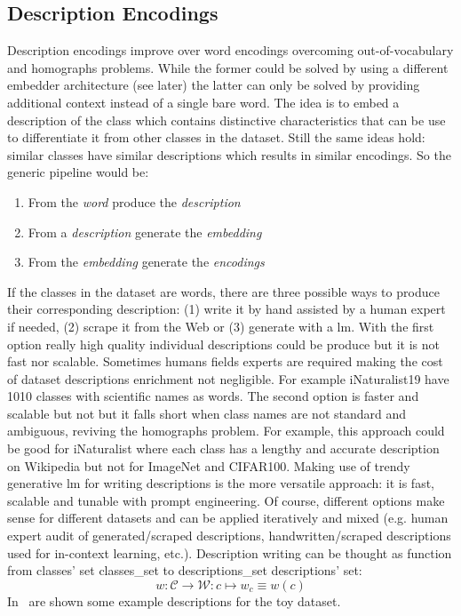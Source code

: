 \subsection{Description Encodings}
\label{subsec:description-encodings}

Description encodings improve over word encodings overcoming out-of-vocabulary and homographs problems. While the former could be solved by using a different embedder architecture (see later) the latter can only be solved by providing additional context instead of a single bare word. 
The idea is to embed a description of the class which contains distinctive characteristics that can be use to differentiate it from other classes in the dataset. Still the same ideas hold: similar classes have similar descriptions which results in similar encodings.
So the generic pipeline would be:
\begin{enumerate}
  \item From the \emph{word} produce the \emph{description}
  \item From a \emph{description} generate the \emph{embedding}
  \item From the \emph{embedding} generate the \emph{encodings}
\end{enumerate}

If the classes in the dataset are words, there are three possible ways to produce their corresponding description: (1) write it by hand assisted by a human expert if needed, (2) scrape it from the Web or (3) generate with a \acrshort{lm}.
With the first option really high quality individual descriptions could be produce but it is not fast nor scalable. Sometimes humans fields experts are required making the cost of dataset descriptions enrichment not negligible. For example iNaturalist19 have 1010 classes with scientific names as words.
The second option is faster and scalable but not but it falls short when class names are not standard and ambiguous, reviving the homographs problem. For example, this approach could be good for iNaturalist where each class has a lengthy and accurate description on Wikipedia but not for ImageNet and CIFAR100.
Making use of trendy generative \acrshort{lm} for writing descriptions is the more versatile approach: it is fast, scalable and tunable with prompt engineering.
Of course, different options make sense for different datasets and can be applied iteratively and mixed (e.g. human expert audit of generated/scraped descriptions, handwritten/scraped descriptions used for in-context learning, etc.).
Description writing can be thought as function from classes' set \gls{classes_set} to \gls{descriptions_set} descriptions' set:
\begin{equation}
  w : \mathcal{C} \to \mathcal{W}:
  c \mapsto w_c \equiv w(c)
  \label{eq:desc-writing}
\end{equation}
In~ are shown some example descriptions for the toy dataset.

